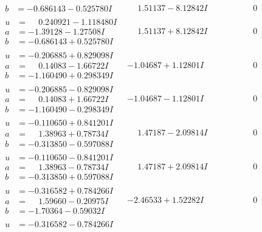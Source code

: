 \documentclass[1p]{elsarticle_modified}
\theoremstyle{definition}
\begin{document}
$$\begin{array}{c|c|c}
\begin{aligned}
b &= -0.686143 - 0.525780 I\end{aligned}
 & \phantom{-}1.51137 - 8.12842 I & \phantom{-0.000000 } 0 \\ \hline\begin{aligned}
u &= \phantom{-}0.240921 - 1.118480 I \\
a &= -1.39128 - 1.27508 I \\
b &= -0.686143 + 0.525780 I\end{aligned}
 & \phantom{-}1.51137 + 8.12842 I & \phantom{-0.000000 } 0 \\ \hline\begin{aligned}
u &= -0.206885 + 0.829098 I \\
a &= \phantom{-}0.14083 - 1.66722 I \\
b &= -1.160490 + 0.298349 I\end{aligned}
 & -1.04687 + 1.12801 I & \phantom{-0.000000 } 0 \\ \hline\begin{aligned}
u &= -0.206885 - 0.829098 I \\
a &= \phantom{-}0.14083 + 1.66722 I \\
b &= -1.160490 - 0.298349 I\end{aligned}
 & -1.04687 - 1.12801 I & \phantom{-0.000000 } 0 \\ \hline\begin{aligned}
u &= -0.110650 + 0.841201 I \\
a &= \phantom{-}1.38963 + 0.78734 I \\
b &= -0.313850 - 0.597088 I\end{aligned}
 & \phantom{-}1.47187 - 2.09814 I & \phantom{-0.000000 } 0 \\ \hline\begin{aligned}
u &= -0.110650 - 0.841201 I \\
a &= \phantom{-}1.38963 - 0.78734 I \\
b &= -0.313850 + 0.597088 I\end{aligned}
 & \phantom{-}1.47187 + 2.09814 I & \phantom{-0.000000 } 0 \\ \hline\begin{aligned}
u &= -0.316582 + 0.784266 I \\
a &= \phantom{-}1.59660 - 0.20975 I \\
b &= -1.70364 - 0.59032 I\end{aligned}
 & -2.46533 + 1.52282 I & \phantom{-0.000000 } 0 \\ \hline\begin{aligned}
u &= -0.316582 - 0.784266 I \\

\end{aligned}
\end{array}$$
\end{document}
